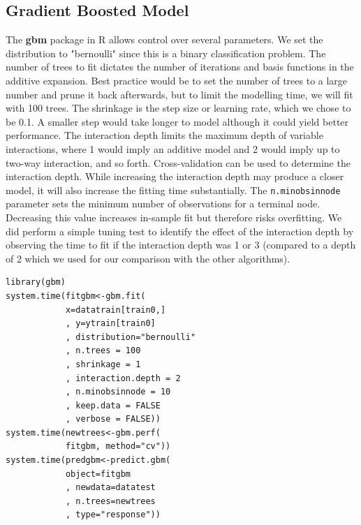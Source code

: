 \documentclass[twoside]{article}
\begin{document}
\begin{multicols}{2}
\subsection{Gradient Boosted Model}
The \textbf{gbm} package in R allows control over several parameters. We set the distribution to "bernoulli" since this is a binary classification problem. The number of trees to fit dictates the number of iterations and basis functions in the additive expansion\cite{29}. Best practice would be to set the number of trees to a large number and prune it back afterwards, but to limit the modelling time, we will fit with 100 trees. The shrinkage is the step size or learning rate, which we chose to be 0.1. A smaller step would take longer to model although it could yield better performance. The interaction depth limits the maximum depth of variable interactions, where 1 would imply an additive model and 2 would imply up to two-way interaction, and so forth. Cross-validation can be used to determine the interaction depth. While increasing the interaction depth may produce a closer model, it will also increase the fitting time substantially. The \texttt{n.minobsinnode} parameter sets the minimum number of observations for a terminal node. Decreasing this value increases in-sample fit but therefore risks overfitting. We did perform a simple tuning test to identify the effect of the interaction depth by observing the time to fit if the interaction depth was 1 or 3 (compared to a depth of 2 which we used for our comparison with the other algorithms).
\begin{verbatim}
library(gbm)
system.time(fitgbm<-gbm.fit(
            x=datatrain[train0,]
            , y=ytrain[train0]
            , distribution="bernoulli"
            , n.trees = 100
            , shrinkage = 1
            , interaction.depth = 2
            , n.minobsinnode = 10
            , keep.data = FALSE
            , verbose = FALSE))
system.time(newtrees<-gbm.perf(
            fitgbm, method="cv"))
system.time(predgbm<-predict.gbm(
            object=fitgbm
            , newdata=datatest
            , n.trees=newtrees
            , type="response"))
\end{verbatim}


\end{multicols}
\end{document}
